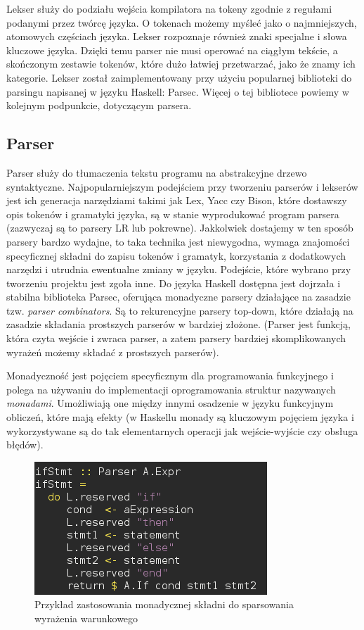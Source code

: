 Lekser służy do podziału wejścia kompilatora na tokeny zgodnie z regułami podanymi przez twórcę języka. O tokenach możemy myśleć jako o najmniejszych, atomowych częściach języka. Lekser rozpoznaje również znaki specjalne i słowa kluczowe języka. Dzięki temu parser nie musi operować na ciągłym tekście, a skończonym zestawie tokenów, które dużo łatwiej przetwarzać, jako że znamy ich kategorie. Lekser został zaimplementowany przy użyciu popularnej biblioteki do parsingu napisanej w języku Haskell: Parsec. Więcej o tej bibliotece powiemy w kolejnym podpunkcie, dotyczącym parsera.

\subsection{Parser}

Parser służy do tłumaczenia tekstu programu na abstrakcyjne drzewo syntaktyczne. Najpopularniejszym podejściem przy tworzeniu parserów i lekserów jest ich generacja narzędziami takimi jak Lex, Yacc czy Bison, które dostawszy opis tokenów i gramatyki języka, są w stanie wyprodukować program parsera (zazwyczaj są to parsery LR lub pokrewne). Jakkolwiek dostajemy w ten sposób parsery bardzo wydajne, to taka technika jest niewygodna, wymaga znajomości specyficznej składni do zapisu tokenów i gramatyk, korzystania z dodatkowych narzędzi i utrudnia ewentualne zmiany w języku. Podejście, które wybrano przy tworzeniu projektu jest zgoła inne. Do języka Haskell dostępna jest dojrzała i stabilna biblioteka Parsec, oferująca monadyczne parsery działające na zasadzie tzw. \textit{parser combinators}. Są to rekurencyjne parsery top-down, które działają na zasadzie składania prostszych parserów w bardziej złożone. (Parser jest funkcją, która czyta wejście i zwraca parser, a zatem parsery bardziej skomplikowanych wyrażeń możemy składać z prostszych parserów).

Monadyczność jest pojęciem specyficznym dla programowania funkcyjnego i polega na używaniu do implementacji oprogramowania struktur nazywanych \textit{monadami}. Umożliwiają one między innymi osadzenie w języku funkcyjnym obliczeń, które mają efekty (w Haskellu monady są kluczowym pojęciem języka i wykorzystywane są do tak elementarnych operacji jak wejście-wyjście czy obsługa błędów).

\begin{figure}
  \begin{center}
    \includegraphics[scale=0.5]{images/parsing.png}
    \caption{Przykład zastosowania monadycznej składni do sparsowania wyrażenia warunkowego}
    \label{fig:parsing}
  \end{center}
\end{figure}

